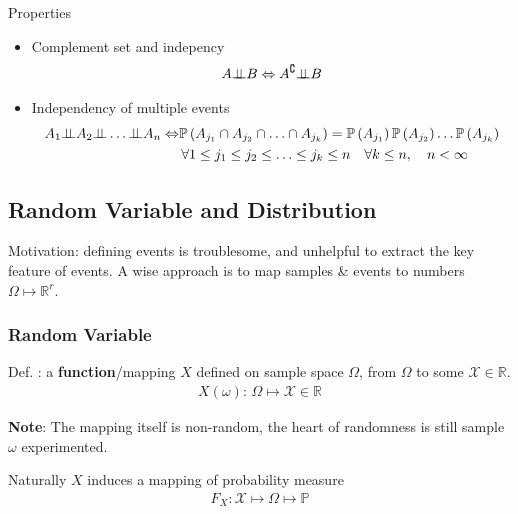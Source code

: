     Properties
    \begin{itemize}[topsep=2pt,itemsep=0pt]
        \item Complement set and indepency
        \begin{align}
            A\bot\!\!\!\bot B\Leftrightarrow A^\complement \bot\!\!\!\bot B 
        \end{align}
        \item Independency of multiple events
        \begin{align}
            A_1\independent A_2\independent\ldots \independent A_n \Leftrightarrow &\mathbb{P}\left( A_{j_1}\cap A_{j_2}\cap\ldots\cap A_{j_k} \right)=\mathbb{P}\left( A_{j_1} \right) \mathbb{P}\left( A_{j_2} \right) \ldots \mathbb{P}\left( A_{j_k} \right) \\
            &  \,\forall 1\leq j_1\leq j_2\leq \ldots \leq j_k\leq n\quad \forall k\leq n,\quad n<\infty
        \end{align}
    \end{itemize}
    
        

\subsection{Random Variable and Distribution}\label{SectionPropertiesOfRandomVariableAndVector}

Motivation: defining events is troublesome, and unhelpful to extract the key feature of events. A wise approach is to map samples \& events to numbers $ \Omega \mapsto \mathbb{R}^r $.

\subsubsection{Random Variable}
    Def. : a \textbf{function}/mapping $X$ defined on sample space $\Omega$,  from $\Omega$ to some $\mathscr{X}\in\mathbb{R} $.
    \begin{align}
        X(\omega ):\, \Omega \mapsto \mathscr{X}\in\mathbb{R} 
    \end{align}

    \textbf{Note}: The mapping itself is non-random, the heart of randomness is still sample $ \omega  $ experimented. 

    Naturally $ X $ induces a mapping of probability measure
    \begin{align}
        F_X: \mathscr{X} \mapsto \Omega \mapsto \mathbb{P} 
    \end{align}

